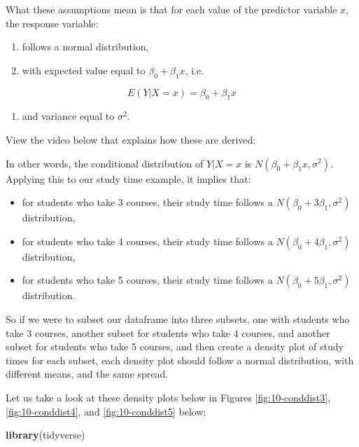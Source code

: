 \documentclass[
]{book}
\newenvironment{Shaded}{\begin{snugshade}}{\end{snugshade}}
\newcommand{\FunctionTok}[1]{\textcolor[rgb]{0.13,0.29,0.53}{\textbf{#1}}}
\newcommand{\NormalTok}[1]{#1}
\providecommand{\tightlist}{%
  \setlength{\itemsep}{0pt}\setlength{\parskip}{0pt}}
\begin{document}
What these assumptions mean is that for each value of the predictor variable \(x\), the response variable:

\begin{enumerate}
\def\labelenumi{\arabic{enumi}.}
\tightlist
\item
  follows a normal distribution,
\item
  with expected value equal to \(\beta_0+\beta_{1} x\), i.e.
\end{enumerate}

\begin{equation} 
E(Y|X=x) = \beta_0+\beta_{1} x 
\label{eq:10-SLR}
\end{equation}

\begin{enumerate}
\def\labelenumi{\arabic{enumi}.}
\setcounter{enumi}{2}
\tightlist
\item
  and variance equal to \(\sigma^2\).
\end{enumerate}

View the video below that explains how these are derived:

In other words, the conditional distribution of \(Y|X=x\) is \(N(\beta_0+\beta_{1} x, \sigma^2)\). Applying this to our study time example, it implies that:

\begin{itemize}
\tightlist
\item
  for students who take 3 courses, their study time follows a \(N(\beta_0 + 3\beta_1, \sigma^2)\) distribution,
\item
  for students who take 4 courses, their study time follows a \(N(\beta_0 + 4\beta_1, \sigma^2)\) distribution,
\item
  for students who take 5 courses, their study time follows a \(N(\beta_0 + 5\beta_1, \sigma^2)\) distribution.
\end{itemize}

So if we were to subset our dataframe into three subsets, one with students who take 3 courses, another subset for students who take 4 courses, and another subset for students who take 5 courses, and then create a density plot of study times for each subset, each density plot should follow a normal distribution, with different means, and the same spread.

Let us take a look at these density plots below in Figures \ref{fig:10-conddist3}, \ref{fig:10-conddist4}, and \ref{fig:10-conddist5} below:

\begin{Shaded}
\begin{Highlighting}[]
\FunctionTok{library}\NormalTok{(tidyverse)}
\end{Highlighting}
\end{Shaded}
\end{document}
